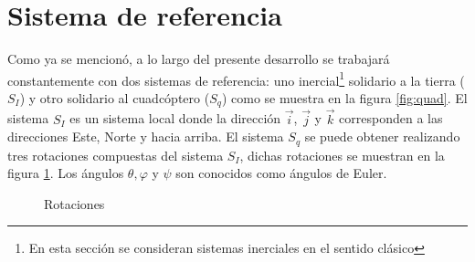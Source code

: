 \documentclass[main]{subfiles}
\begin{document}
\section{Sistema de referencia}

Como ya se mencion\'o, a lo largo del presente desarrollo se trabajar\'a constantemente con dos sistemas de referencia: uno inercial\footnote{En esta secci\'on se consideran sistemas inerciales en el sentido cl\'asico} solidario a la tierra ($S_I$) y otro solidario al cuadc\'optero ($S_q$) como se muestra en la figura \ref{fig:quad}. El sistema $S_I$ es un sistema local donde la direcci\'on $\vec{i}$, $\vec{j}$ y $\vec{k}$ corresponden a las direcciones Este, Norte y hacia arriba.
El sistema $S_q$ se puede obtener realizando tres rotaciones compuestas del sistema $S_I$, dichas rotaciones se muestran en la figura \ref{fig:rotaciones}. Los \'angulos $\theta, \varphi$ y $\psi$ son conocidos como \'angulos de Euler.

\begin{figure} [h!]
  \centering
  \caption{Rotaciones}
  \label{fig:rotaciones}
\end{figure}
\end{document}
